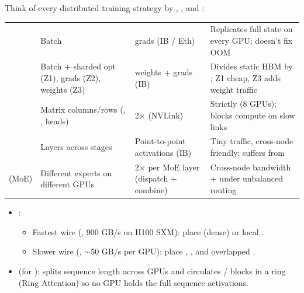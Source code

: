 Think of every distributed training strategy by , , and :

\par\vspace{4pt}\noindent\begin{minipage}{\linewidth}
\small
\begin{tabularx}{\linewidth}{@{}l Y Y Y@{}}
\toprule
{} &  &  &  \\
\midrule
{} & Batch  &  grads (IB / Eth) & Replicates full  state on every GPU; doesn't fix OOM \\
 & Batch  + sharded opt (Z1), grads (Z2), weights (Z3) &  weights +  grads (IB) & Divides static HBM by ; Z1 cheap, Z3 adds weight traffic \\
 & Matrix columns/rows (, , heads) & 2$\times$   (NVLink) & Strictly  (8 GPUs); blocks compute on slow links \\
 & Layers  across stages & Point-to-point  activations (IB) & Tiny traffic, cross-node friendly; suffers from  \\
 (MoE) & Different experts on different GPUs & 2$\times$  per MoE layer (dispatch + combine) & Cross-node bandwidth +  under unbalanced routing \\
\bottomrule
\end{tabularx}
\end{minipage}\par\vspace{4pt}

\begin{itemize}
    \item {}:
    \begin{itemize}
        \item Fastest wire (, 900 GB/s on H100 SXM): place  (dense) or local .
        \item Slower wire (, $\sim$50 GB/s per GPU): place , , and overlapped .
    \end{itemize}
    \item {} (for ): splits sequence length  across GPUs and circulates / blocks in a ring (Ring Attention) so no GPU holds the full sequence activations.
\end{itemize}

